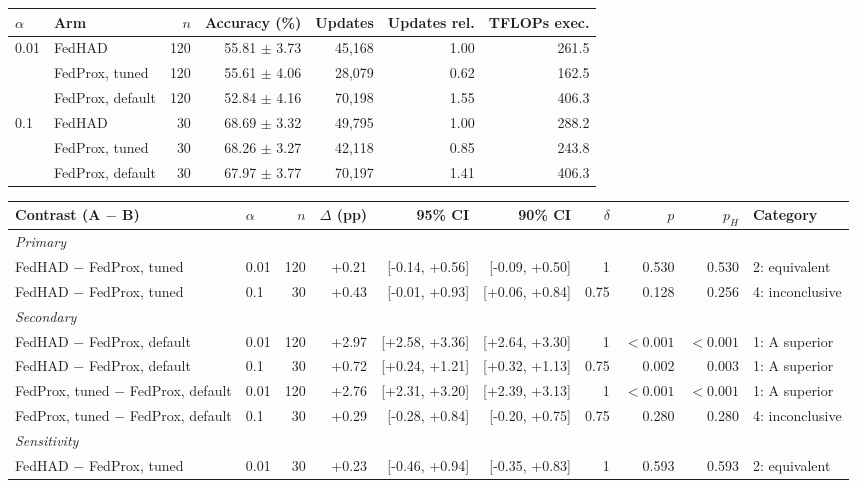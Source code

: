 \begin{tabular}{llrrrrr}
\toprule
$\alpha$ & Arm & $n$ & Accuracy (\%) & Updates & Updates rel. & TFLOPs exec. \\
\midrule
0.01 & FedHAD & 120 & 55.81 $\pm$ 3.73 & 45{,}168 & 1.00 & 261.5 \\
 & FedProx, tuned & 120 & 55.61 $\pm$ 4.06 & 28{,}079 & 0.62 & 162.5 \\
 & FedProx, default & 120 & 52.84 $\pm$ 4.16 & 70{,}198 & 1.55 & 406.3 \\
\midrule
0.1 & FedHAD & 30 & 68.69 $\pm$ 3.32 & 49{,}795 & 1.00 & 288.2 \\
 & FedProx, tuned & 30 & 68.26 $\pm$ 3.27 & 42{,}118 & 0.85 & 243.8 \\
 & FedProx, default & 30 & 67.97 $\pm$ 3.77 & 70{,}197 & 1.41 & 406.3 \\
\bottomrule
\end{tabular}

\vspace{6pt}

\begin{tabular}{llrrrrrrrl}
\toprule
Contrast (A $-$ B) & $\alpha$ & $n$ & $\Delta$ (pp) & 95\% CI & 90\% CI & $\delta$ & $p$ & $p_H$ & Category \\
\midrule
\multicolumn{10}{l}{\textit{Primary}} \\
FedHAD $-$ FedProx, tuned & 0.01 & 120 & +0.21 & [-0.14, +0.56] & [-0.09, +0.50] & 1 & 0.530 & 0.530 & 2: equivalent \\
FedHAD $-$ FedProx, tuned & 0.1 & 30 & +0.43 & [-0.01, +0.93] & [+0.06, +0.84] & 0.75 & 0.128 & 0.256 & 4: inconclusive \\
\multicolumn{10}{l}{\textit{Secondary}} \\
FedHAD $-$ FedProx, default & 0.01 & 120 & +2.97 & [+2.58, +3.36] & [+2.64, +3.30] & 1 & $<0.001$ & $<0.001$ & 1: A superior \\
FedHAD $-$ FedProx, default & 0.1 & 30 & +0.72 & [+0.24, +1.21] & [+0.32, +1.13] & 0.75 & 0.002 & 0.003 & 1: A superior \\
FedProx, tuned $-$ FedProx, default & 0.01 & 120 & +2.76 & [+2.31, +3.20] & [+2.39, +3.13] & 1 & $<0.001$ & $<0.001$ & 1: A superior \\
FedProx, tuned $-$ FedProx, default & 0.1 & 30 & +0.29 & [-0.28, +0.84] & [-0.20, +0.75] & 0.75 & 0.280 & 0.280 & 4: inconclusive \\
\multicolumn{10}{l}{\textit{Sensitivity}} \\
FedHAD $-$ FedProx, tuned & 0.01 & 30 & +0.23 & [-0.46, +0.94] & [-0.35, +0.83] & 1 & 0.593 & 0.593 & 2: equivalent \\
\bottomrule
\end{tabular}
